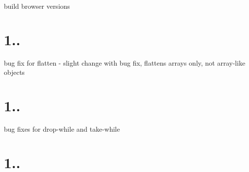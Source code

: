 \begin{DoxyItemize}
\item build browser versions
\end{DoxyItemize}

\section*{1..}


\begin{DoxyItemize}
\item bug fix for {\ttfamily flatten} -\/ slight change with bug fix, flattens arrays only, not array-\/like objects
\end{DoxyItemize}

\section*{1..}


\begin{DoxyItemize}
\item bug fixes for {\ttfamily drop-\/while} and {\ttfamily take-\/while}
\end{DoxyItemize}

\section*{1..}


